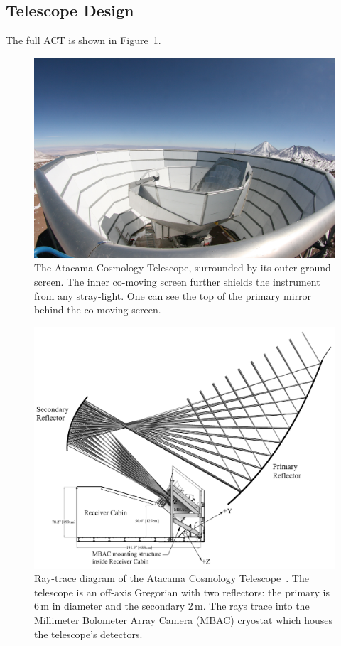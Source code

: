\subsection{Telescope Design}
The full ACT is shown in Figure~\ref{fig:act_site}.  

\begin{figure}
    \centering
    \includegraphics[width = .6\textwidth]{Figures/act_inst_close.jpeg}
    \caption{The Atacama Cosmology Telescope, surrounded by its outer ground screen. The inner co-moving screen further shields the instrument from any stray-light.  One can see the top of the primary mirror behind the co-moving screen.}
    \label{fig:act_site}
\end{figure}

\begin{figure}[t]
    \centering
    \includegraphics[width = .8\textwidth]{Figures/act_inst.pdf}
    \caption{Ray-trace diagram of the Atacama Cosmology Telescope~\cite{act_inst}.  The telescope is an off-axis Gregorian with two reflectors: the primary is 6\,m in diameter and the secondary 2\,m.  The rays trace into the Millimeter Bolometer Array Camera (MBAC) cryostat which houses the telescope's detectors.}
    \label{fig:act_inst}
\end{figure}

